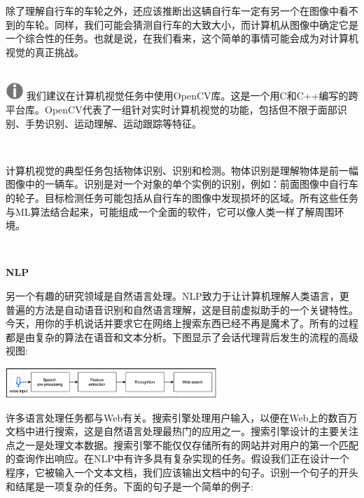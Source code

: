 除了理解自行车的车轮之外，还应该推断出这辆自行车一定有另一个在图像中看不到的车轮。同样，我们可能会猜测自行车的大致大小，而计算机从图像中确定它是一个综合性的任务。也就是说，在我们看来，这个简单的事情可能会成为对计算机视觉的真正挑战。 \par

\hspace*{\fill} \\ %
\includegraphics[width=0.05\textwidth]{images/warn}
我们建议在计算机视觉任务中使用OpenCV库。这是一个用C和C++编写的跨平台库。OpenCV代表了一组针对实时计算机视觉的功能，包括但不限于面部识别、手势识别、运动理解、运动跟踪等特征。 \par
\noindent\textbf{}\ \par

计算机视觉的典型任务包括物体识别、识别和检测。物体识别是理解物体是前一幅图像中的一辆车。识别是对一个对象的单个实例的识别，例如：前面图像中自行车的轮子。目标检测任务可能包括从自行车的图像中发现损坏的区域。所有这些任务与ML算法结合起来，可能组成一个全面的软件，它可以像人类一样了解周围环境。 \par

\noindent\textbf{}\ \par
\textbf{NLP} \ \par
另一个有趣的研究领域是自然语言处理。NLP致力于让计算机理解人类语言，更普遍的方法是自动语音识别和自然语言理解，这是目前虚拟助手的一个关键特性。今天，用你的手机说话并要求它在网络上搜索东西已经不再是魔术了。所有的过程都是由复杂的算法在语音和文本分析。下图显示了会话代理背后发生的流程的高级视图: \par

\begin{center}
	\includegraphics[width=0.6\textwidth]{content/Section-3/Chapter-15/4}
\end{center}

许多语言处理任务都与Web有关。搜索引擎处理用户输入，以便在Web上的数百万文档中进行搜索，这是自然语言处理最热门的应用之一。搜索引擎设计的主要关注点之一是处理文本数据。搜索引擎不能仅仅存储所有的网站并对用户的第一个匹配的查询作出响应。在NLP中有许多具有复杂实现的任务。假设我们正在设计一个程序，它被输入一个文本文档，我们应该输出文档中的句子。识别一个句子的开头和结尾是一项复杂的任务。下面的句子是一个简单的例子: \par

